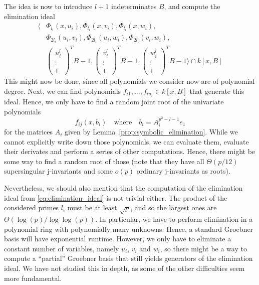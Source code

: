 The idea is now to introduce $l + 1$ indeterminates $B$, and compute the elimination ideal
\begin{equation}
\label{eq:elimination_ideal}
\begin{split}
    \langle &\Phi_{l_i}(x, u_i), \Phi_{l_i}(x, v_i), \Phi_{l_i}(x, w_i), \\
    &\Phi_{2l_i}(u_i, v_i), \Phi_{2l_i}(u_i, w_i), \Phi_{2l_i}(v_i, w_i), \\
    &\left(\begin{matrix*}
        u_i^l \\
        \vdots \\
        1
    \end{matrix*}\right)^T B - 1, \left(\begin{matrix*}
        v_i^l \\
        \vdots \\
        1
    \end{matrix*}\right)^T B - 1, \left(\begin{matrix*}
        w_i^l \\
        \vdots \\
        1
    \end{matrix*}\right)^T B - 1 \rangle \cap k[x, B]
\end{split}
\end{equation}
This might now be done, since all polynomials we consider now are of polynomial degree.
Next, we can find polynomials $f_{i1}, ..., f_{in_i} \in k[x, B]$ that generate this ideal.
Hence, we only have to find a random joint root of the univariate polynomials
\begin{equation*}
    f_{i j}(x, b_i) \quad \text{where} \quad b_i = A_i^{p^2 - l - 1} e_1
\end{equation*}
for the matrices $A_i$ given by Lemma~\ref{prop:symbolic_elimination}.
While we cannot explicitly write down those polynomials, we can evaluate them, evaluate their derivates and perform a series of other computations.
Hence, there might be some way to find a random root of those (note that they have all $\Theta(p/12)$ supersingular j-invariants and some $o(p)$ ordinary j-invariants as roots).

Nevertheless, we should also mention that the computation of the elimination ideal from \ref{eq:elimination_ideal} is not trivial either.
The product of the considered primes $l_i$ must be at least $\sqrt{p}$, and so the largest ones are $\Theta(\log(p)/\log\log(p))$.
In particular, we have to perform elimination in a polynomial ring with polynomially many unknowns.
Hence, a standard Groebner basis will have exponential runtime.
However, we only have to eliminate a constant number of variables, namely $u_i$, $v_i$ and $w_i$, so there might be a way to compute a ``partial'' Groebner basis that still yields generators of the elimination ideal.
We have not studied this in depth, as some of the other difficulties seem more fundamental.

